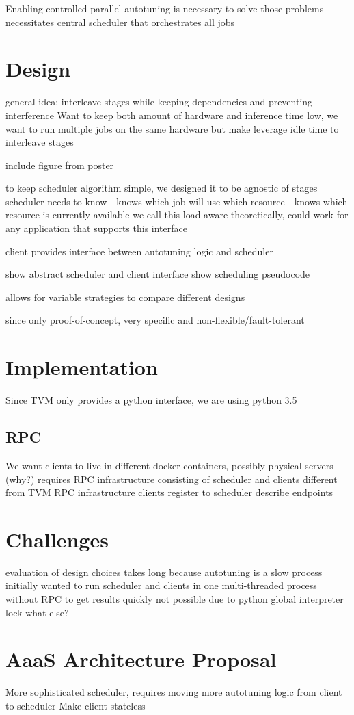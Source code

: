 Enabling controlled parallel autotuning is necessary to solve those problems
necessitates central scheduler that orchestrates all jobs

\section{Design}
general idea: interleave stages while keeping dependencies and preventing interference
Want to keep both amount of hardware and inference time low, we want to run multiple jobs on the same hardware but make leverage idle time to interleave stages


include figure from poster

to keep scheduler algorithm simple, we designed it to be agnostic of stages
scheduler needs to know
- knows which job will use which resource
- knows which resource is currently available
we call this load-aware
theoretically, could work for any application that supports this interface

client provides interface between autotuning logic and scheduler

show abstract scheduler and client interface
show scheduling pseudocode

allows for variable strategies to compare different designs

since only proof-of-concept, very specific and non-flexible/fault-tolerant

\section{Implementation}
Since TVM only provides a python interface, we are using python 3.5


\subsection{RPC}
We want clients to live in different docker containers, possibly physical servers (why?)
requires RPC infrastructure consisting of scheduler and clients
different from TVM RPC infrastructure
clients register to scheduler
describe endpoints

\section{Challenges}
evaluation of design choices takes long because autotuning is a slow process
initially wanted to run scheduler and clients in one multi-threaded process without RPC to get results quickly
not possible due to python global interpreter lock
what else?

\section{AaaS Architecture Proposal}
More sophisticated scheduler, requires moving more autotuning logic from client to scheduler
Make client stateless
